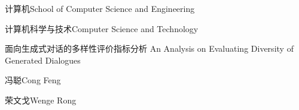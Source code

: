 
\school
{计算机}{School of Computer Science and Engineering}

\major
{计算机科学与技术}{Computer Science and Technology}

\thesistitle
{面向生成式对话的多样性评价指标分析}
{An Analysis on Evaluating Diversity of Generated Dialogues}
{}
{}

\thesisauthor
{冯聪}{Cong Feng}

\teacher
{荣文戈}{Wenge Rong}







